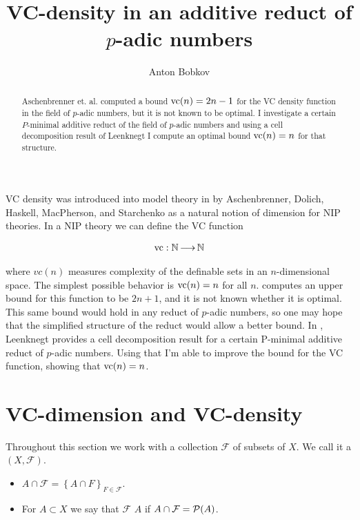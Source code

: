 \documentclass{amsart}
\title{VC-density in an additive reduct of $p$-adic numbers}
\author{Anton Bobkov}
\newcommand{\F}{\mathcal F}
\newcommand{\curly}[1]{\left\{#1\right\}}
\begin{document}
\begin{abstract}
        Aschenbrenner et. al. computed a bound $\operatorname{vc}(n) = 2n - 1$ for the VC density function in the field of $p$-adic numbers,
        but it is not known to be optimal.
	I investigate a certain $P$-minimal additive reduct of the field of $p$-adic numbers and
        using a cell decomposition result of Leenknegt I compute an optimal bound $\operatorname{vc}(n) = n$ for that structure.
\end{abstract}


\maketitle

VC density was introduced into model theory in \cite{density} by Aschenbrenner, Dolich, Haskell, MacPherson, and Starchenko as a natural notion of dimension for NIP theories.
In a NIP theory we can define the VC function

\begin{align*}
	\operatorname{vc} : \mathbb{N} \operatorname{\longrightarrow} \mathbb{N}
\end{align*}

where $vc(n)$ measures complexity of the definable sets in an $n$-dimensional space.
The simplest possible behavior is $\operatorname{vc}(n) = n$ for all $n$.
\cite{density} computes an upper bound for this function to be $2n+1$, and it is not known whether it is optimal.
This same bound would hold in any reduct of $p$-adic numbers, so one may hope that the simplified structure of the reduct would allow a better bound.
In \cite{reduct}, Leenknegt provides a cell decomposition result for a certain P-minimal additive reduct of $p$-adic numbers.
Using that I'm able to improve the bound for the VC function, showing that $\operatorname{vc}(n) = n$.


\section{VC-dimension and VC-density}


Throughout this section we work with a collection $\F$ of subsets of $X$.
We call it a  $(X, \F)$.

\begin{Definition}
  \begin{itemize}
    \item $A \cap \F = \curly{A \cap F}_{F\in \F}$.
    \item For $A \subset X$ we say that $\F$  $A$ if $A \cap \F = \PP(A)$.
  \end{itemize}    
\end{Definition}  
\end{document}
